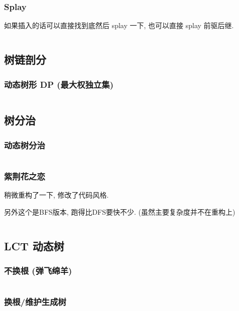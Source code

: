 \documentclass[a4paper, twoside]{article}
\begin{document}
\begin{multicols}{2}
				\subsubsection{Splay}
					如果插入的话可以直接找到底然后 splay 一下, 也可以直接 splay 前驱后继.
					\inputminted{cpp}{../src/datastructure/文艺平衡树.cpp}
				
			\subsection{树链剖分}
				\subsubsection{动态树形 DP (最大权独立集)}
					\inputminted{cpp}{../src/datastructure/动态树形DP.cpp}
				
			\subsection{树分治}

				
				\subsubsection{动态树分治}
					\inputminted{cpp}{../src/datastructure/动态树分治.cpp}

				\subsubsection{紫荆花之恋}
					稍微重构了一下, 修改了代码风格.

					另外这个是BFS版本, 跑得比DFS要快不少. (虽然主要复杂度并不在重构上)
					\inputminted{cpp}{../src/datastructure/紫荆花之恋.cpp}
	
			\subsection{LCT 动态树}
				\subsubsection{不换根 (弹飞绵羊)}
					\inputminted{cpp}{../src/datastructure/LCT(不换根).cpp}
			
				\subsubsection{换根/维护生成树}
					\inputminted{cpp}{../src/datastructure/LCT(换根).cpp}


\end{multicols}
\end{document}
